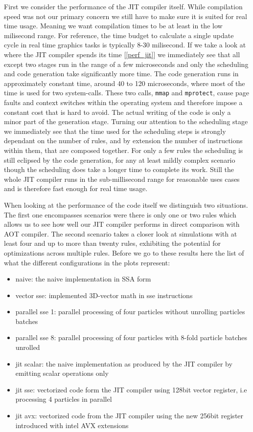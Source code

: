 First we consider the performance of the JIT compiler itself. While compilation speed was not our primary concern we still have to make sure it is suited for real time usage. Meaning we want compilation times to be at least in the low milisecond range. For reference, the time budget to calculate a single update cycle in real time graphics tasks is typically 8-30 milisecond.
If we take a look at where the JIT compiler spends its time [\ref{perf_jit}] we immediately see that all except two stages run in the range of a few microseconds and only the scheduling and code generation take significantly more time. The code generation runs in approximately constant time, around 40 to 120 microseconds, where most of the time is used for two system-calls. These two calls, \texttt{mmap} and \texttt{mprotect}, cause page faults and context switches within the operating system and therefore impose a constant cost that is hard to avoid. The actual writing of the code is only a minor part of the generation stage. Turning our attention to the scheduling stage we immediately see that the time used for the scheduling steps is strongly dependant on the number of rules, and by extension the number of instructions within them, that are composed together. For only a few rules the scheduling is still eclipsed by the code generation, for any at least mildly complex scenario though the scheduling does take a longer time to complete its work. Still the whole JIT compiler runs in the sub-millisecond range for reasonable uses cases and is therefore fast enough for real time usage.


When looking at the performance of the code itself we distinguish two situations. The first one encompasses scenarios were there is only one or two rules which allows us to see how well our JIT compiler performs in direct comparison with AOT compiler. The second scenario takes a closer look at simulations with at least four and up to more than twenty rules, exhibiting the potential for optimizations across multiple rules. Before we go to these results here the list of what the different configurations in the plots represent:
\begin{itemize}
\item naive: the naive implementation in SSA form
\item vector sse: implemented 3D-vector math in sse instructions
\item parallel sse 1: parallel processing of four particles without unrolling particles batches
\item parallel sse 8: parallel processing of four particles with 8-fold particle batches unrolled
\item jit scalar: the naive implementation as produced by the JIT compiler by emitting scalar operations only
\item jit sse: vectorized code form the JIT compiler using 128bit vector register, i.e processing 4 particles in parallel
\item jit avx: vectorized code from the JIT compiler using the new 256bit register introduced with intel AVX extensions
\end{itemize}

